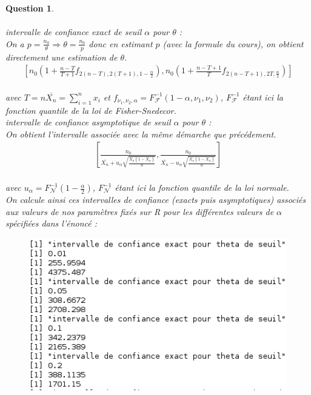 \documentclass[a4paper,11pt]{article}
\newtheorem{exo1}{Question}
\begin{document}
\begin{exo1} \ \\ \\
intervalle de confiance exact de seuil $\alpha$ pour $\theta$ : \ \\
On a $p=\frac{n_{0}}{\theta} \Rightarrow \theta=\frac{n_{0}}{p}$ donc en estimant $p$ (avec la formule du cours), on obtient directement une estimation de $\theta$.
\begin{equation}
\begin{aligned}
\left[ n_{0}(1+\frac{n-T}{T+1}f_{2(n-T),2(T+1),1-\frac{\alpha}{2}}),n_{0}(1+\frac{n-T+1}{T}f_{2(n-T+1),2T,\frac{\alpha}{2}})\right]
\end{aligned}
\end{equation} \ \\
avec $T=n\overline{X_{n}}=\sum_{i=1}^{n} x_{i}$ et $f_{\nu_{1},\nu_{2},\alpha} = F_{\mathscr{F}}^{-1}(1-\alpha,\nu_{1},\nu_{2})$, $F_{\mathscr{F}}^{-1}$ étant ici la fonction quantile de la loi de Fisher-Snedecor. \ \\
intervalle de confiance asymptotique de seuil $\alpha$ pour $\theta$ : \ \\
On obtient l'intervalle associée avec la même démarche que précédement.
\begin{equation}
\begin{aligned}
\left[ \frac{n_{0}}{\overline{X_{n}}+u_{\alpha}\sqrt{\frac{\overline{X_{n}}(1-\overline{X_{n}})}{n}}},\frac{n_{0}}{\overline{X_{n}}-u_{\alpha}\sqrt{\frac{\overline{X_{n}}(1-\overline{X_{n}})}{n}}}\right]
\end{aligned}
\end{equation} \ \\
avec $u_{\alpha}=F_{\mathscr{N}}^{-1}(1-\frac{\alpha}{2})$, $F_{\mathscr{N}}^{-1}$ étant ici la fonction quantile de la loi normale. \ \\
On calcule ainsi ces intervalles de confiance (exacts puis asymptotiques) associés aux valeurs de nos paramètres fixés sur R pour les différentes valeurs de $\alpha$ spécifiées dans l'énoncé :
\begin{figure}[h]
\includegraphics[scale=0.7]{images/Q1_4_exact.png}

\end{figure}
\end{exo1}
\end{document}
